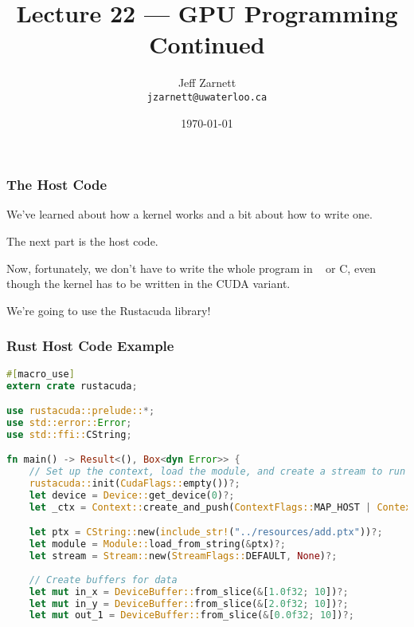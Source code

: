 

\title{Lecture 22 --- GPU Programming Continued }

\author{Jeff Zarnett \\ \small \texttt{jzarnett@uwaterloo.ca}}
\date{\today}




\begin{frame}
  \titlepage

\end{frame}


\begin{frame}
\frametitle{The Host Code}

We've learned about how a kernel works and a bit about how to write one. 

The next part is the host code.

Now, fortunately, we don't have to write the whole program in \CPP~ or C, even though the kernel has to be written in the CUDA variant. 

We're going to use the Rustacuda library!
\end{frame}


\begin{frame}[fragile]
\frametitle{Rust Host Code Example}
\begin{lstlisting}[language=Rust]
#[macro_use]
extern crate rustacuda;

use rustacuda::prelude::*;
use std::error::Error;
use std::ffi::CString;

fn main() -> Result<(), Box<dyn Error>> {
    // Set up the context, load the module, and create a stream to run kernels in.
    rustacuda::init(CudaFlags::empty())?;
    let device = Device::get_device(0)?;
    let _ctx = Context::create_and_push(ContextFlags::MAP_HOST | ContextFlags::SCHED_AUTO, device)?;

    let ptx = CString::new(include_str!("../resources/add.ptx"))?;
    let module = Module::load_from_string(&ptx)?;
    let stream = Stream::new(StreamFlags::DEFAULT, None)?;
    
    // Create buffers for data
    let mut in_x = DeviceBuffer::from_slice(&[1.0f32; 10])?;
    let mut in_y = DeviceBuffer::from_slice(&[2.0f32; 10])?;
    let mut out_1 = DeviceBuffer::from_slice(&[0.0f32; 10])?;
\end{lstlisting}

\end{frame}


